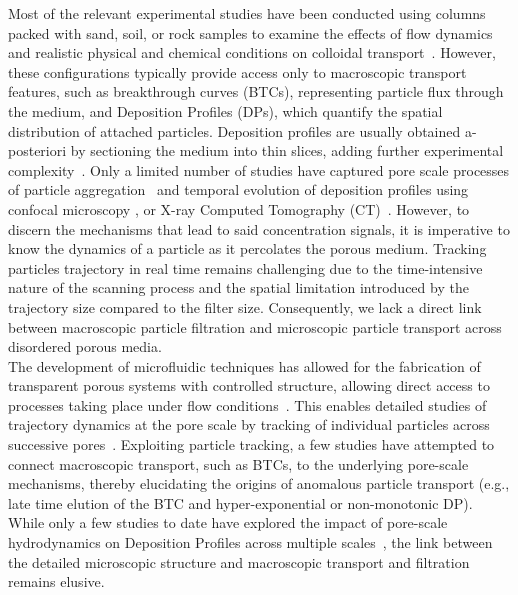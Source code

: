 \documentclass[singlecolumn,pre,notitlepage,preprintnumbers,floatfix,superscriptaddress]{revtex4-1}
\begin{document}
\noindent
Most of the relevant experimental studies have been conducted using columns packed with sand, soil, or rock samples to examine the effects of flow dynamics and realistic physical and chemical conditions on colloidal transport~\cite{johnson1996colloid,baygents_variation_1998,molnar2015predicting}. However, these configurations typically provide access only to macroscopic transport features, such as breakthrough curves (BTCs), representing particle flux through the medium, and Deposition Profiles (DPs), which quantify the spatial distribution of attached particles. Deposition profiles are usually obtained a-posteriori by sectioning the medium into thin slices, adding further experimental complexity~\cite{Li_EST2005}. Only a limited number of studies have captured pore scale processes of particle aggregation~\cite{perez_morphology_2020,gerberPRL2018} and temporal evolution of deposition profiles using confocal microscopy \cite{bizmark_multiscale_2020}, or X-ray Computed Tomography (CT)~\cite{patino_2023}. However, to discern the mechanisms that lead to said concentration signals, it is imperative to know the dynamics of a particle as it percolates the porous medium. Tracking particles trajectory in real time remains challenging due to the time-intensive nature of the scanning process and the spatial limitation introduced by the trajectory size compared to the filter size. Consequently, we lack a direct link between macroscopic particle filtration and microscopic particle transport across disordered porous media. \\

\noindent
The development of microfluidic techniques has allowed for the fabrication of transparent porous systems with controlled structure, allowing direct access to processes taking place under flow conditions~\cite{Bartolo_NatPhys2024, Dehkharghani2019Bacterial, deAnnaNaturePhys2021, waisbord_fluidic_2021}. This enables detailed studies of trajectory dynamics at the pore scale by tracking of individual particles across successive pores~\cite{scheidweiler_trait-specific_2020, waisbord_anomalous_2019}. Exploiting particle tracking, a few studies \cite{bordoloi_structure_2022,Scheidweiler2020} have attempted to connect macroscopic transport, such as BTCs, to the underlying pore-scale mechanisms, thereby elucidating the origins of anomalous particle transport (e.g., late time elution of the BTC and hyper-exponential or non-monotonic DP). While only a few studies to date have explored the impact of pore-scale hydrodynamics on Deposition Profiles across multiple scales~\cite{bizmark_multiscale_2020,pradel2024role}, the link between the detailed microscopic structure and macroscopic transport and filtration remains elusive. \\
\end{document}
